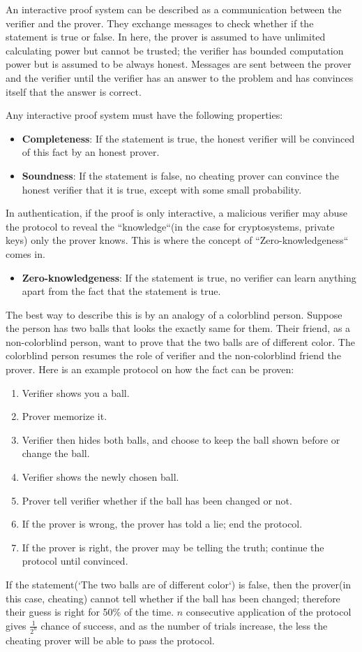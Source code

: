 \documentclass{report}
\begin{document}
		An interactive proof system can be described as a communication between the verifier and the prover. They exchange messages to check whether if the statement is true or false. In here, the prover is assumed to have unlimited calculating power but cannot be trusted; the verifier has bounded computation power but is assumed to be always honest. Messages are sent between the prover and the verifier until the verifier has an answer to the problem and has convinces itself that the answer is correct.
		
		Any interactive proof system must have the following properties:
		\begin{itemize}
			\item \textbf{Completeness}: If the statement is true, the honest verifier will be convinced of this fact by an honest prover.
			\item \textbf{Soundness}: If the statement is false, no cheating prover can convince the honest verifier that it is true, except with some small probability.
		\end{itemize}
		In authentication, if the proof is only interactive, a malicious verifier may abuse the protocol to reveal the ``knowledge``(in the case for cryptosystems, private keys) only the prover knows. This is where the concept of ``Zero-knowledgeness`` comes in.
		\begin{itemize}
			\item \textbf{Zero-knowledgeness}: If the statement is true, no verifier can learn anything apart from the fact that the statement is true.
		\end{itemize}
		The best way to describe this is by an analogy of a colorblind person. Suppose the person has two balls that looks the exactly same for them. Their friend, as a non-colorblind person, want to prove that the two balls are of different color. The colorblind person resumes the role of verifier and the non-colorblind friend the prover. Here is an example protocol on how the fact can be proven:
		\begin{enumerate}
			\item Verifier shows you a ball.
			\item Prover memorize it.
			\item Verifier then hides both balls, and choose to keep the ball shown before or change the ball.
			\item Verifier shows the newly chosen ball.
			\item Prover tell verifier whether if the ball has been changed or not.
			\item If the prover is wrong, the prover has told a lie; end the protocol.
			\item If the prover is right, the prover may be telling the truth; continue the protocol until convinced.
		\end{enumerate}
		If the statement(`The two balls are of different color`) is false, then the prover(in this case, cheating) cannot tell whether if the ball has been changed; therefore their guess is right for 50\% of the time. $n$ consecutive application of the protocol gives $\frac{1}{2^n}$ chance of success, and as the number of trials increase, the less the cheating prover will be able to pass the protocol.
		
\end{document}
